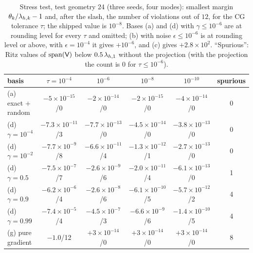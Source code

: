 \begin{table}[t]
\centering
\caption{Stress test, test geometry 24 (three seeds, four modes): smallest margin $\theta_k/\lamh_k-1$ and, after the slash, the number of violations out of $12$, for the CG tolerance $\tau$; the shipped value is $10^{-8}$. Bases (a) and (d) with $\gamma\le10^{-6}$ are at rounding level for every $\tau$ and omitted; (b) with noise $\epsilon\le10^{-6}$ is at rounding level or above, with $\epsilon=10^{-4}$ it gives $+10^{-6}$, and (c) gives $+2.8\times10^{2}$. ``Spurious'': Ritz values of $\operatorname{span}(\mathsf{V})$ below $0.5\,\lamh_1$ without the projection (with the projection the count is $0$ for $\tau\le10^{-6}$).}
\label{tab:A04-stress}
\scriptsize
\setlength{\tabcolsep}{3pt}
\begin{tabular}{@{}lccccc@{}}
\toprule
basis & $\tau=10^{-4}$ & $10^{-6}$ & $10^{-8}$ & $10^{-10}$ & spurious \\
\midrule
(a) exact $+$ random & $-5\!\times\!10^{-15}$/0 & $-2\!\times\!10^{-14}$/0 & $-2\!\times\!10^{-15}$/0 & $-4\!\times\!10^{-14}$/0 & 0 \\
(d) $\gamma=10^{-4}$ & $-7.3\!\times\!10^{-11}$/3 & $-7.7\!\times\!10^{-13}$/0 & $-4.5\!\times\!10^{-14}$/0 & $-3.8\!\times\!10^{-13}$/0 & 0 \\
(d) $\gamma=10^{-2}$ & $-7.7\!\times\!10^{-9}$/8 & $-6.6\!\times\!10^{-11}$/4 & $-1.3\!\times\!10^{-12}$/1 & $-2.7\!\times\!10^{-13}$/0 & 0 \\
(d) $\gamma=0.5$ & $-7.5\!\times\!10^{-7}$/7 & $-2.6\!\times\!10^{-9}$/6 & $-2.0\!\times\!10^{-11}$/4 & $-6.1\!\times\!10^{-13}$/0 & 1 \\
(d) $\gamma=0.9$ & $-6.2\!\times\!10^{-6}$/4 & $-2.6\!\times\!10^{-8}$/6 & $-6.1\!\times\!10^{-10}$/5 & $-5.7\!\times\!10^{-12}$/2 & 4 \\
(d) $\gamma=0.99$ & $-7.4\!\times\!10^{-5}$/4 & $-4.5\!\times\!10^{-7}$/3 & $-6.6\!\times\!10^{-9}$/6 & $-1.4\!\times\!10^{-10}$/5 & 4 \\
(g) pure gradient & $-1.0$/12 & $+3\!\times\!10^{-14}$/0 & $+3\!\times\!10^{-14}$/0 & $+3\!\times\!10^{-14}$/0 & 8 \\
\bottomrule
\end{tabular}
\end{table}

